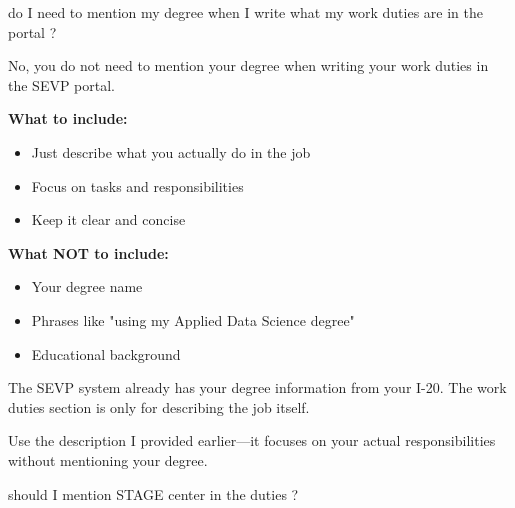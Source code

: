 \begin{userprompt}
do I need to mention my degree when I write what my work duties are in the portal ?
\end{userprompt}

\begin{botresponse}
No, you do not need to mention your degree when writing your work duties in the SEVP portal.

\textbf{What to include:}

\begin{itemize}
\item Just describe what you actually do in the job
\item Focus on tasks and responsibilities
\item Keep it clear and concise
\end{itemize}

\textbf{What NOT to include:}

\begin{itemize}
\item Your degree name
\item Phrases like "using my Applied Data Science degree"
\item Educational background
\end{itemize}

The SEVP system already has your degree information from your I-20. The work duties section is only for describing the job itself.

Use the description I provided earlier—it focuses on your actual responsibilities without mentioning your degree.
\end{botresponse}

\begin{userprompt}
should I mention STAGE center in the duties ?
\end{userprompt}

